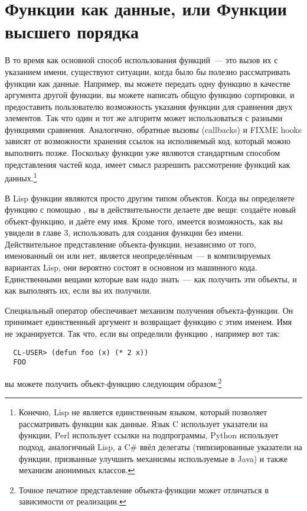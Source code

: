 \section{Функции как данные, или Функции высшего порядка}

В то время как основной способ использования функций~--- это вызов их с указанием имени,
существуют ситуации, когда было бы полезно рассматривать функции как данные.  Например, вы
можете передать одну функцию в качестве аргумента другой функции, вы можете написать общую
функцию сортировки, и предоставить пользователю возможность указания функции для сравнения
двух элементов.  Так что один и тот же алгоритм может использоваться с разными функциями
сравнения.  Аналогично, обратные вызовы (callbacks) и FIXME hooks зависят от возможности
хранения ссылок на исполняемый код, который можно выполнить позже.  Поскольку функции уже
являются стандартным способом представления частей кода, имеет смысл разрешить
рассмотрение функций как данных.\footnote{Конечно, Lisp не является единственным языком,
  который позволяет рассматривать функции как данные.  Язык C использует указатели на
  функции, Perl использует ссылки на подпрограммы, Python использует подход, аналогичный
  Lisp, а C\# ввёл делегаты (типизированные указатели на функции, призванные улучшить
  механизмы используемые в Java) и также механизм анонимных классов.}

В Lisp функции являются просто другим типом объектов.  Когда вы определяете функцию с
помощью , вы в действительности делаете две вещи: создаёте новый
объект-функцию, и даёте ему имя.  Кроме того, имеется возможность, как вы увидели в главе
3, использовать  для создания функции без имени.  Действительное
представление объекта-функции, независимо от того, именованный он или нет, является
неопределённым~--- в компилируемых вариантах Lisp, они вероятно состоят в основном из
машинного кода.  Единственными вещами которые вам надо знать~--- как получить эти объекты,
и как выполнять их, если вы их получили.

Специальный оператор  обеспечивает механизм получения объекта-функции.  Он
принимает единственный аргумент и возвращает функцию с этим именем.  Имя не экранируется.
Так что, если вы определили функцию , например вот так:

\begin{verbatim}
  CL-USER> (defun foo (x) (* 2 x))
  FOO
\end{verbatim}

вы можете получить объект-функцию следующим образом:\footnote{Точное печатное
  представление объекта-функции может отличаться в зависимости от реализации.}

